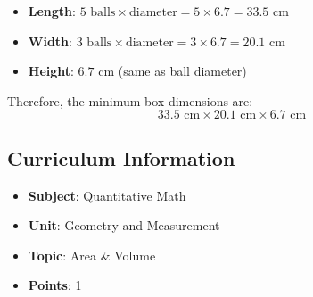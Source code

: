 \documentclass[12pt]{article}
\begin{document}
\begin{itemize}
\item \textbf{Length}: $5 \text{ balls} \times \text{diameter} = 5 \times 6.7 = 33.5 \text{ cm}$
\item \textbf{Width}: $3 \text{ balls} \times \text{diameter} = 3 \times 6.7 = 20.1 \text{ cm}$
\item \textbf{Height}: $6.7 \text{ cm}$ (same as ball diameter)
\end{itemize}

Therefore, the minimum box dimensions are:
$$33.5 \text{ cm} \times 20.1 \text{ cm} \times 6.7 \text{ cm}$$

\subsection*{Curriculum Information}
\begin{itemize}
\item \textbf{Subject}: Quantitative Math
\item \textbf{Unit}: Geometry and Measurement
\item \textbf{Topic}: Area \& Volume
\item \textbf{Points}: 1
\end{itemize}
\end{document}
